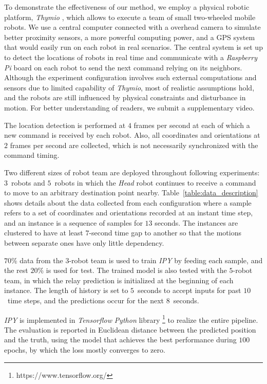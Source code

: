 \documentclass[letterpaper, 10 pt, conference]{ieeeconf}  %
\begin{document}
	
	To demonstrate the effectiveness of our method, we employ a physical robotic platform, 
	\emph{Thymio} \cite{Shin14}, which allows to execute a team of small two-wheeled mobile robots.   
	We use a central computer connected with a overhead camera to simulate better proximity 
	sensors, a more powerful computing power, and a GPS system that would easily run on each robot in 
	real scenarios. The central system is set up to detect the locations of robots in real time 
	and communicate with a \emph{Raspberry Pi} board \cite{Upton14} on each robot to send
	the next command relying on its neighbors. Although the experiment configuration involves 
	such external computations and sensors due to limited capability of \emph{Thymio}, 
	most of realistic assumptions hold, and the robots are still influenced by 
	physical constraints and disturbance in motion. For better understanding of readers, 
	we submit a supplementary video. 
	
	The location detection is performed at $4$ frames per second at each of which 
	a new command is received by each robot. Also, 
	all coordinates and orientations at $2$ frames per second are collected, which 
	is not necessarily synchronized with the command timing. 
	
	Two different sizes of robot team are deployed throughout following experiments: 
	$3$~robots and $5$~robots in which the \emph{Head} robot continues to receive a command to 
	move to an arbitrary destination point nearby. 
	Table~\ref{table:data_description} shows details about the data collected from 
	each configuration where a sample refers to a set of coordinates and orientations recorded 
	at an instant time step, and an instance is a sequence of samples for $13$ seconds. 
	The instances are clustered to have at least $7$-second time gap to another so that
	the motions between separate ones have only little dependency. 
	
	$70$\% data from the $3$-robot team is used to train \emph{IPY} by feeding each sample, 
	and the rest $20$\% is used for test. 
	The trained model is also tested with the $5$-robot team, in which the relay prediction is 
	initialized at the beginning of each instance. 
	The length of history is set to $5$~seconds to accept inputs for past $10$~time steps, and 
	the predictions occur for the next $8$~seconds.  
	 	
	\emph{IPY} is implemented in \emph{Tensorflow} \emph{Python} library \footnote{https://www.tensorflow.org/} 
	to realize the entire pipeline. The evaluation is reported in Euclidean distance between 
	the predicted position and the truth, using the model that achieves the best performance 
	during $100$ epochs, by which the loss mostly converges to zero. 
		
\end{document}
